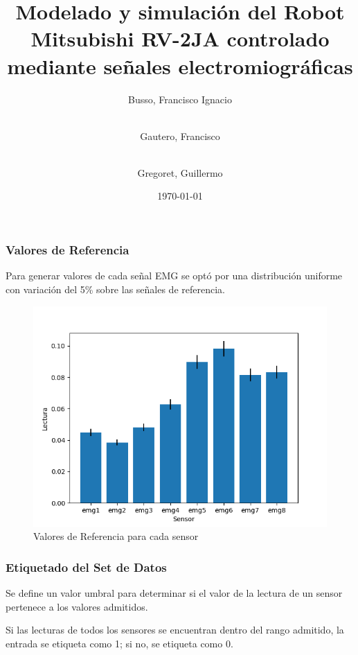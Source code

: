 \documentclass{beamer}
\title{Modelado y simulación del Robot Mitsubishi RV-2JA controlado
mediante señales electromiográficas}
\author{
    Busso, Francisco Ignacio \and
    \\ Gautero, Francisco \and
    \\ Gregoret, Guillermo}
\institute{Universidad Tecnológica Nacional\\Facultad Regional Santa Fe}
\date{\today}
\begin{document}
    \begin{frame}
        \titlepage
    \end{frame}

    \begin{frame}
        \frametitle{Valores de Referencia}
        \hspace*{20pt}Para generar valores de cada señal EMG se optó por una distribución uniforme con 
        variación del 5\% sobre las señales de referencia.
        \begin{figure}
            \centering
            \includegraphics[scale=0.4]{plot.png}
            \caption{Valores de Referencia para cada sensor}
        \end{figure}
    \end{frame} 

    \begin{frame}
        \frametitle{Etiquetado del Set de Datos}
        \hspace*{20pt}Se define un valor umbral para determinar si el valor de la lectura de un sensor pertenece a los valores admitidos.
        \vspace*{5pt}
        
        \vspace*{10pt}
        \hspace*{20pt}Si las lecturas de todos los sensores se encuentran dentro del rango admitido, la entrada se etiqueta como 1; si no, se etiqueta como 0.
        \vspace*{5pt}
        
    \end{frame} 
\end{document}
